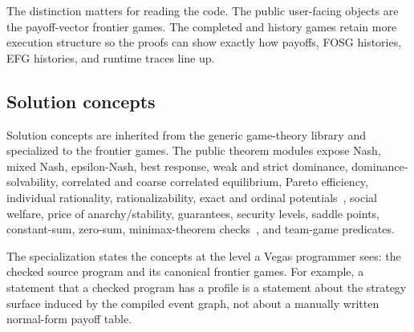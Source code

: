 The distinction matters for reading the code.  The public user-facing
objects are the payoff-vector frontier games.  The completed and history
games retain more execution structure so the proofs can show exactly how
payoffs, FOSG histories, EFG histories, and runtime traces line up.

\subsection{Solution concepts}
\label{sec:fosg-solution}

Solution concepts are inherited from the generic game-theory library and
specialized to the frontier games.  The public theorem modules expose
Nash, mixed Nash, epsilon-Nash, best response, weak and strict dominance,
dominance-solvability, correlated and coarse correlated equilibrium,
Pareto efficiency, individual rationality, rationalizability, exact and
ordinal potentials~\citep{MondererShapley1996}, social welfare, price of
anarchy/stability, guarantees, security levels, saddle points,
constant-sum, zero-sum, minimax-theorem checks~\citep{vonNeumannMinimax},
and team-game predicates.

The specialization states the concepts at the level a Vegas programmer
sees: the checked source program and its canonical frontier games.
For example, a statement that a checked program has a
 profile is a statement about the
strategy surface induced by the compiled event graph, not about a
manually written normal-form payoff table.

